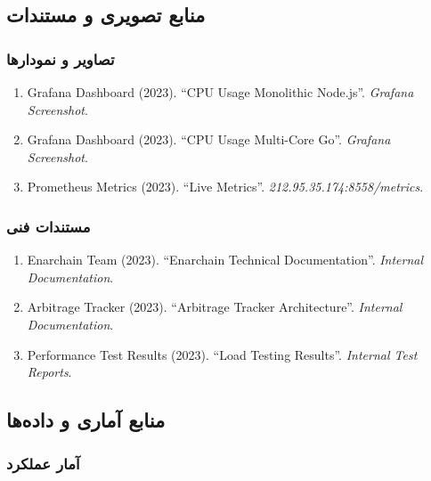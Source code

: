 \documentclass[
]{article}
\begin{document}
\subsection{منابع تصویری و
مستندات}\label{ux645ux646ux627ux628ux639-ux62aux635ux648ux6ccux631ux6cc-ux648-ux645ux633ux62aux646ux62fux627ux62a}

\subsubsection{تصاویر و
نمودارها}\label{ux62aux635ux627ux648ux6ccux631-ux648-ux646ux645ux648ux62fux627ux631ux647ux627}

\begin{enumerate}
\def\labelenumi{\arabic{enumi}.}
\setcounter{enumi}{72}
\item
  Grafana Dashboard (2023). ``CPU Usage Monolithic Node.js''.
  \emph{Grafana Screenshot}.
\item
  Grafana Dashboard (2023). ``CPU Usage Multi-Core Go''. \emph{Grafana
  Screenshot}.
\item
  Prometheus Metrics (2023). ``Live Metrics''.
  \emph{212.95.35.174:8558/metrics}.
\end{enumerate}

\subsubsection{مستندات
فنی}\label{ux645ux633ux62aux646ux62fux627ux62a-ux641ux646ux6cc}

\begin{enumerate}
\def\labelenumi{\arabic{enumi}.}
\setcounter{enumi}{75}
\item
  Enarchain Team (2023). ``Enarchain Technical Documentation''.
  \emph{Internal Documentation}.
\item
  Arbitrage Tracker (2023). ``Arbitrage Tracker Architecture''.
  \emph{Internal Documentation}.
\item
  Performance Test Results (2023). ``Load Testing Results''.
  \emph{Internal Test Reports}.
\end{enumerate}

\subsection{منابع آماری و
داده‌ها}\label{ux645ux646ux627ux628ux639-ux622ux645ux627ux631ux6cc-ux648-ux62fux627ux62fux647ux647ux627}

\subsubsection{آمار
عملکرد}\label{ux622ux645ux627ux631-ux639ux645ux644ux6a9ux631ux62f}
\end{document}
